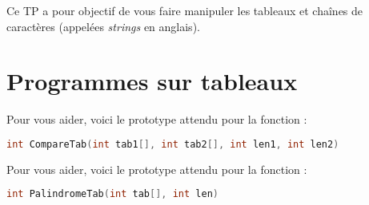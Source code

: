 \documentclass[11pt,a4paper]{article}
\begin{document}
\EncadreTitre

\bigskip


%
%

\bigskip


Ce TP a pour objectif de vous faire manipuler les tableaux et chaînes de caractères (appelées \textit{strings} en anglais).

\bigskip

\section{Programmes sur tableaux}

\medskip


Pour vous aider, voici le prototype attendu pour la fonction :

\begin{lstlisting}[language=C,morekeywords={floor,ceil}]
int CompareTab(int tab1[], int tab2[], int len1, int len2) \end{lstlisting}



Pour vous aider, voici le prototype attendu pour la fonction :

\begin{lstlisting}[language=C,morekeywords={floor,ceil}]
int PalindromeTab(int tab[], int len) \end{lstlisting}


\end{document}
